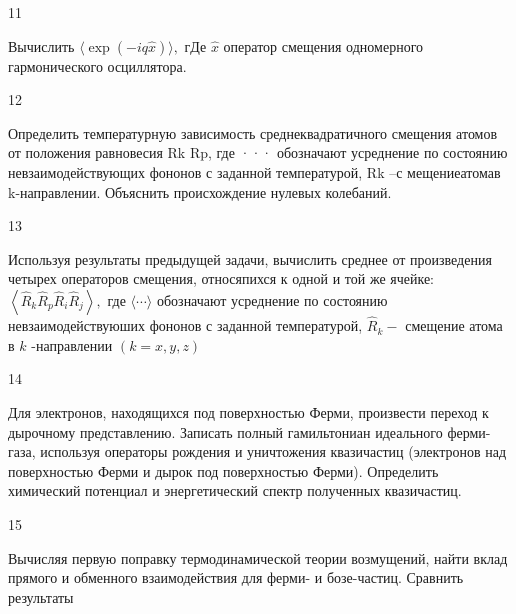 \documentclass[a4paper,12pt]{article} %
\begin{document}
\begin{task}

11

Вычислить  $\langle\exp (-i q \hat{x})\rangle, \text { гДе } \hat{x}$ оператор смещения одномерного гармонического осциллятора.




\end{task}


\begin{task}

12

Определить температурную зависимость среднеквадратичного смещения атомов от положения равновесия Rk Rp, где ··· обозначают усреднение по состоянию невзаимодействующих фононов с заданной температурой,  Rk –с мещениеатомав k-направлении. Объяснить происхождение нулевых колебаний.



\end{task}


\begin{task}

13

Используя результаты предыдущей задачи, вычислить среднее от произведения четырех операторов смещения, относяпихся к одной и той же ячейке: $\left\langle\hat{R}_{k} \hat{R}_{p} \hat{R}_{i} \hat{R}_{j}\right\rangle,$ где $\langle\cdots\rangle$ обозначают усреднение по состоянию невзаимодействуюших фононов с заданной температурой, $\hat{R}_{k}-$ смещение атома в $k$ -направлении $(k=x, y, z)$



\end{task}


\begin{task}

14

Для электронов, находящихся под поверхностью Ферми, произвести переход к дырочному представлению. Записать полный гамильтониан идеального ферми-газа, используя операторы рождения и уничтожения квазичастиц (электронов над поверхностью Ферми и дырок под поверхностью Ферми). Определить химический потенциал и энергетический спектр полученных квазичастиц. 



\end{task}


\begin{task}

15

Вычисляя первую поправку термодинамической теории возмущений, найти вклад прямого и обменного взаимодействия для ферми- и бозе-частиц. Сравнить результаты


\end{task}
\end{document}
